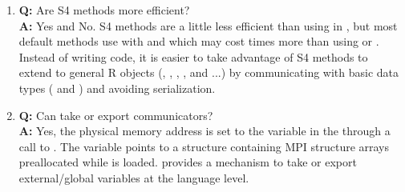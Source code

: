 \begin{enumerate}
\item {\bf\color{blue} Q:}
      Are S4 methods more efficient? \\
      {\bf\color{blue} A:}
      Yes and No. S4 methods are a little less efficient than using
       in , but most default
      methods use  with  and 
      which may cost  times more than using
       or .
      Instead of writing  code, it is easier to take
      advantage of S4 methods to extend to general R objects (,
      , , , and  ...)
      by communicating with basic data types
      ( and ) and avoiding serialization.

%

\item {\bf\color{blue} Q:}
      Can  take or export communicators? \\
      {\bf\color{blue} A:}
      Yes, the physical memory address is set to the variable
       in the  through a call to
      . The variable points to a structure containing MPI
      structure arrays preallocated while  is loaded.
       provides a mechanism to take or export
      external/global variables at the  language level.

\end{enumerate}




